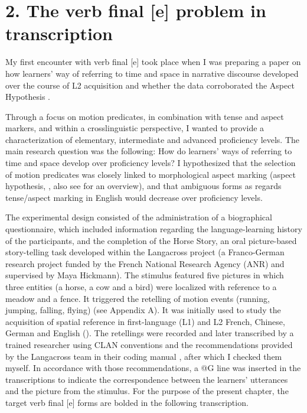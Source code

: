 \documentclass[output=paper,colorlinks,citecolor=brown,modfonts,nonflat]{../langscibook}
\begin{document}
\section{2. The verb final [e] problem in transcription}%

My first encounter with verb final [e] took place when I was preparing a paper on how learners’ way of referring to time and space in narrative discourse developed over the course of L2 acquisition and whether the data corroborated the Aspect Hypothesis \citep{Leclercq2011}.

Through a focus on motion predicates, in combination with tense and aspect markers, and within a crosslinguistic perspective, I wanted to provide a characterization of elementary, intermediate and advanced proficiency levels. The main research question was the following: How do learners’ ways of referring to time and space develop over proficiency levels? I hypothesized that the selection of motion predicates was closely linked to morphological aspect marking (aspect hypothesis, \citealt{AndersenShirai1994,Robison1995}, also see \citealt{Rohde1996} for an overview), and that ambiguous forms as regards tense/aspect marking in English would decrease over proficiency levels.

The experimental design consisted of the administration of a biographical questionnaire, which included information regarding the language-learning history of the participants, and the completion of the Horse Story, an oral picture-based story-telling task developed within the Langacross project (a Franco-German research project funded by the French National Research Agency (ANR) and supervised by Maya Hickmann). The stimulus featured five pictures in which three entities (a horse, a cow and a bird) were localized with reference to a meadow and a fence. It triggered the retelling of motion events (running, jumping, falling, flying) (see Appendix A). It was initially used to study the acquisition of spatial reference in first-language (L1) and L2 French, Chinese, German and English (\citealt{Hendriks1998,HickmannEtAl1998}). The retellings were recorded and later transcribed by a trained researcher using CLAN conventions and the recommendations provided by the Langacross team in their coding manual \citep{HickmannEtAl2011}, after which I checked them myself. In accordance with those recommendations, a @G line was inserted in the transcriptions to indicate the correspondence between the learners’ utterances and the picture from the stimulus. For the purpose of the present chapter, the target verb final [e] forms are bolded in the following transcription.
\end{document}
